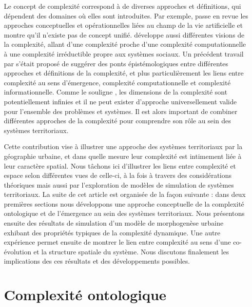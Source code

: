 \documentclass[11pt]{article}
\begin{document}
Le concept de complexité correspond à de diverses approches et définitions, qui dépendent des domaines où elles sont introduites. Par exemple, \cite{chu2008criteria} passe en revue les approches conceptuelles et opérationnelles liées au champ de la vie artificielle et montre qu'il n'existe pas de concept unifié. \cite{deffuant2015visions} développe aussi différentes visions de la complexité, allant d'une complexité proche d'une complexité computationnelle à une complexité irréductible propre aux systèmes sociaux. Un précédent travail par \cite{raimbault2018relating} s'était proposé de suggérer des ponts épistémologiques entre différentes approches et définitions de la complexité, et plus particulièrement les liens entre complexité au sens d'émergence, complexité computationnelle et complexité informationnelle. Comme le souligne \cite{batty2018defining}, les dimensions de la complexité sont potentiellement infinies et il ne peut exister d'approche universellement valide pour l'ensemble des problèmes et systèmes. Il est alors important de combiner différentes approches de la complexité pour comprendre son rôle au sein des systèmes territoriaux. 

Cette contribution vise à illustrer une approche des systèmes territoriaux par la géographie urbaine, et dans quelle mesure leur complexité est intimement liée à leur caractère spatial. Nous tâchons ici d'illustrer les liens entre complexité et espace selon différentes vues de celle-ci, à la fois à travers des considérations théoriques mais aussi par l'exploration de modèles de simulation de systèmes territoriaux. La suite de cet article est organisée de la façon suivante : dans deux premières sections nous développons une approche conceptuelle de la complexité ontologique et de l'émergence au sein des systèmes territoriaux. Nous présentons ensuite des résultats de simulation d'un modèle de morphogenèse urbaine exhibant des propriétés typiques de la complexité dynamique. Une autre expérience permet ensuite de montrer le lien entre complexité au sens d'une co-évolution et la structure spatiale du système. Nous discutons finalement les implications des ces résultats et des développements possibles.



\section{Complexité ontologique}


\end{document}

